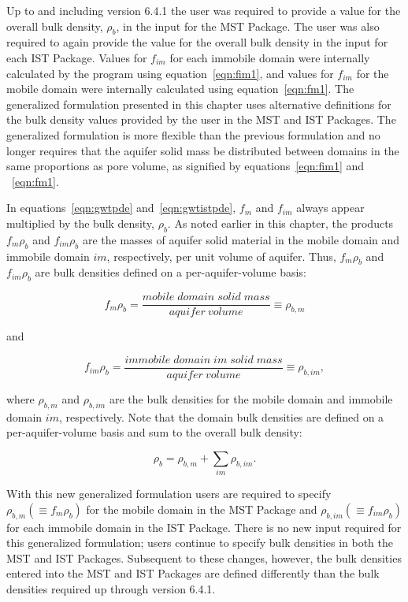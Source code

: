 Up to and including \mf version 6.4.1 the user was required to provide a value for the overall bulk density, $\rho_b$, in the input for the MST Package.  The user was also required to again provide the value for the overall bulk density in the input for each IST Package.  Values for $f_{im}$ for each immobile domain were internally calculated by the program using equation~\ref{eqn:fim1}, and values for $f_{im}$ for the mobile domain were internally calculated using equation~\ref{eqn:fm1}.  The generalized formulation presented in this chapter uses alternative definitions for the bulk density values provided by the user in the MST and IST Packages.  The generalized formulation is more flexible than the previous formulation and no longer requires that the aquifer solid mass be distributed between domains in the same proportions as pore volume, as signified by equations~\ref{eqn:fim1} and ~\ref{eqn:fm1}.

In equations~\ref{eqn:gwtpde} and~\ref{eqn:gwtistpde}, $f_m$ and $f_{im}$ always appear multiplied by the bulk density, $\rho_b$. As noted earlier in this chapter, the products $f_m \rho_b$ and $f_{im} \rho_b$ are the masses of aquifer solid material in the mobile domain and immobile domain $im$, respectively, per unit volume of aquifer. Thus, $f_m \rho_b$ and $f_{im} \rho_b$ are bulk densities defined on a per-aquifer-volume basis:

\begin{equation}
\label{eqn:rho_b_m_1}
f_m \rho_b = \frac{mobile \; domain \; solid \; mass}{aquifer \: volume} \equiv \rho_{b,m}
\end{equation}

\noindent and

\begin{equation}
\label{eqn:rho_b_im_1}
f_{im} \rho_b = \frac{immobile \; domain \; im \; solid \; mass}{aquifer \: volume} \equiv \rho_{b,im},
\end{equation}

\noindent where $\rho_{b,m}$ and $\rho_{b,im}$ are the bulk densities for the mobile domain and immobile domain $im$, respectively. Note that the domain bulk densities are defined on a per-aquifer-volume basis and sum to the overall bulk density:

\begin{equation}
\label{eqn:rho_b_1}
\rho_{b} = \rho_{b, m} + \sum_{im}{\rho_{b, im}}.
\end{equation}

With this new generalized formulation users are required to specify $\rho_{b,m} \left ( \equiv f_m \rho_b \right )$ for the mobile domain in the MST Package and $\rho_{b,im} \left ( \equiv f_{im} \rho_b \right )$ for each immobile domain in the IST Package.  There is no new input required for this generalized formulation; users continue to specify bulk densities in both the MST and IST Packages.  Subsequent to these changes, however, the bulk densities entered into the MST and IST Packages are defined differently than the bulk densities required up through \mf version 6.4.1.

